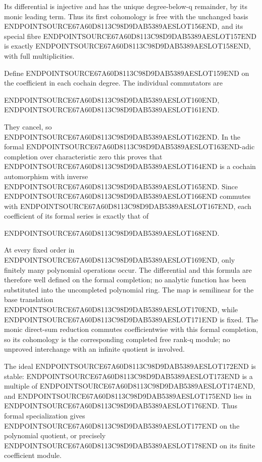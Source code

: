 Its differential is injective and has the unique degree-below-q remainder, by its monic leading term. Thus its first cohomology is free with the unchanged basis ENDPOINTSOURCE67A60D8113C98D9DAB5389AESLOT156END, and its special fibre ENDPOINTSOURCE67A60D8113C98D9DAB5389AESLOT157END is exactly ENDPOINTSOURCE67A60D8113C98D9DAB5389AESLOT158END, with full multiplicities.

Define ENDPOINTSOURCE67A60D8113C98D9DAB5389AESLOT159END on the coefficient in each cochain degree. The individual commutators are

ENDPOINTSOURCE67A60D8113C98D9DAB5389AESLOT160END, ENDPOINTSOURCE67A60D8113C98D9DAB5389AESLOT161END.

They cancel, so ENDPOINTSOURCE67A60D8113C98D9DAB5389AESLOT162END. In the formal ENDPOINTSOURCE67A60D8113C98D9DAB5389AESLOT163END-adic completion over characteristic zero this proves that ENDPOINTSOURCE67A60D8113C98D9DAB5389AESLOT164END is a cochain automorphism with inverse ENDPOINTSOURCE67A60D8113C98D9DAB5389AESLOT165END. Since ENDPOINTSOURCE67A60D8113C98D9DAB5389AESLOT166END commutes with ENDPOINTSOURCE67A60D8113C98D9DAB5389AESLOT167END, each coefficient of its formal series is exactly that of

ENDPOINTSOURCE67A60D8113C98D9DAB5389AESLOT168END.

At every fixed order in ENDPOINTSOURCE67A60D8113C98D9DAB5389AESLOT169END, only finitely many polynomial operations occur. The differential and this formula are therefore well defined on the formal completion; no analytic function has been substituted into the uncompleted polynomial ring. The map is semilinear for the base translation ENDPOINTSOURCE67A60D8113C98D9DAB5389AESLOT170END, while ENDPOINTSOURCE67A60D8113C98D9DAB5389AESLOT171END is fixed. The monic direct-sum reduction commutes coefficientwise with this formal completion, so its cohomology is the corresponding completed free rank-q module; no unproved interchange with an infinite quotient is involved.

The ideal ENDPOINTSOURCE67A60D8113C98D9DAB5389AESLOT172END is stable: ENDPOINTSOURCE67A60D8113C98D9DAB5389AESLOT173END is a multiple of ENDPOINTSOURCE67A60D8113C98D9DAB5389AESLOT174END, and ENDPOINTSOURCE67A60D8113C98D9DAB5389AESLOT175END lies in ENDPOINTSOURCE67A60D8113C98D9DAB5389AESLOT176END. Thus formal specialization gives ENDPOINTSOURCE67A60D8113C98D9DAB5389AESLOT177END on the polynomial quotient, or precisely ENDPOINTSOURCE67A60D8113C98D9DAB5389AESLOT178END on its finite coefficient module.

